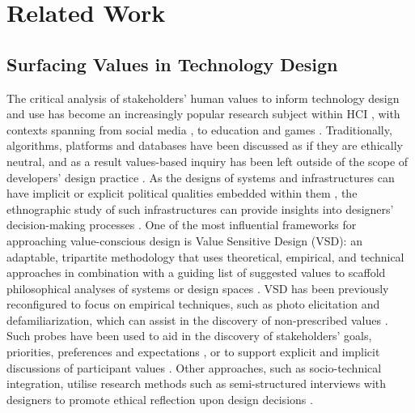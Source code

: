 \section{Related Work}

\subsection{Surfacing Values in Technology Design}

The critical analysis of stakeholders' human values to inform technology design and use has become an increasingly popular research subject within HCI \cite{shilton2018}, with contexts spanning from social media \cite{DeVito2021}, to education \cite{richardson2017} and games \cite{flanagan2014}. Traditionally, algorithms, platforms and databases have been discussed as if they are ethically neutral, and as a result values-based inquiry has been left outside of the scope of developers' design practice \cite{Shilton2013}. As the designs of systems and infrastructures can have implicit or explicit political qualities embedded within them \cite{winner1980}, the ethnographic study of such infrastructures can provide insights into designers' decision-making processes \cite{Star1999}. One of the most influential frameworks for approaching value-conscious design is Value Sensitive Design (VSD): an adaptable, tripartite methodology that uses theoretical, empirical, and technical approaches in combination with a guiding list of suggested values to scaffold philosophical analyses of systems or design spaces \cite{friedman2006}. VSD has been previously reconfigured to focus on empirical techniques, such as photo elicitation and defamiliarization, which can assist in the discovery of non-prescribed values \cite{LeDantec2009}. Such probes have been used to aid in the discovery of stakeholders' goals, priorities, preferences and expectations \cite{flanagan2014, GrowAGame}, or to support explicit and implicit discussions of participant values \cite{Alshehri2020}. Other approaches, such as socio-technical integration, utilise research methods such as semi-structured interviews with designers to promote ethical reflection upon design decisions \cite{fisher2007}. 

